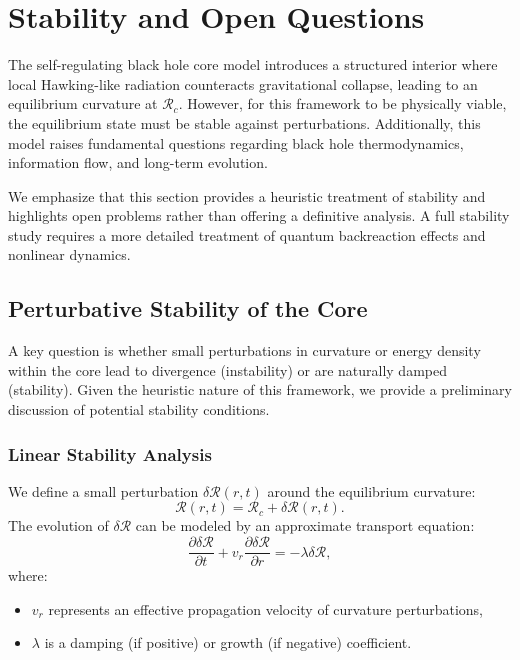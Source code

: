 \section{Stability and Open Questions}
\label{sec:stability}

The self-regulating black hole core model introduces a structured interior where local Hawking-like radiation counteracts gravitational collapse, leading to an equilibrium curvature at \( \mathcal{R}_c \). However, for this framework to be physically viable, the equilibrium state must be stable against perturbations. Additionally, this model raises fundamental questions regarding black hole thermodynamics, information flow, and long-term evolution.

We emphasize that this section provides a heuristic treatment of stability and highlights open problems rather than offering a definitive analysis. A full stability study requires a more detailed treatment of quantum backreaction effects and nonlinear dynamics.

\subsection{Perturbative Stability of the Core}
A key question is whether small perturbations in curvature or energy density within the core lead to divergence (instability) or are naturally damped (stability). Given the heuristic nature of this framework, we provide a preliminary discussion of potential stability conditions.

\subsubsection{Linear Stability Analysis}
We define a small perturbation \( \delta \mathcal{R}(r,t) \) around the equilibrium curvature:
\begin{equation}
    \mathcal{R}(r,t) = \mathcal{R}_c + \delta \mathcal{R}(r,t).
\end{equation}
The evolution of \( \delta \mathcal{R} \) can be modeled by an approximate transport equation:
\begin{equation}
    \frac{\partial \delta \mathcal{R}}{\partial t} + v_r \frac{\partial \delta \mathcal{R}}{\partial r} = -\lambda \delta \mathcal{R},
\end{equation}
where:
\begin{itemize}
    \item \( v_r \) represents an effective propagation velocity of curvature perturbations,
    \item \( \lambda \) is a damping (if positive) or growth (if negative) coefficient.
\end{itemize}

